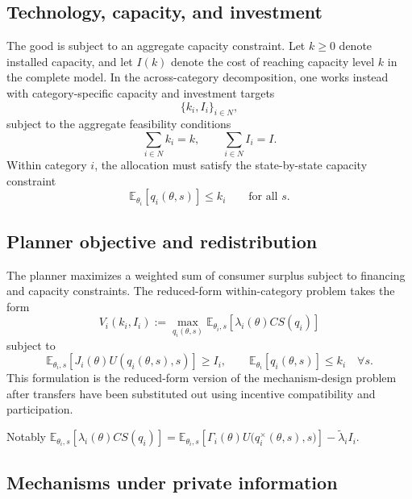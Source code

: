 \documentclass[master.tex]{subfiles}
\begin{document}
\subsection{Technology, capacity, and investment}

The good is subject to an aggregate capacity constraint. Let $k \ge 0$ denote installed capacity, and let $I(k)$ denote the cost of reaching capacity level $k$ in the complete model. In the across-category decomposition, one works instead with category-specific capacity and investment targets
\[
\{k_i,I_i\}_{i\in N},
\]
subject to the aggregate feasibility conditions
\[
\sum_{i\in N} k_i = k, \qquad \sum_{i\in N} I_i = I.
\]
Within category $i$, the allocation must satisfy the state-by-state capacity constraint
\[
\mathbb E_{\theta_i}[q_i(\theta,s)] \le k_i \qquad \text{for all } s.
\]

\subsection{Planner objective and redistribution}

The planner maximizes a weighted sum of consumer surplus subject to financing and capacity constraints. The reduced-form within-category problem takes the form
\[
V_i(k_i,I_i) := \max_{q_i(\theta,s)} \mathbb E_{\theta_i,s}[\lambda_i(\theta)CS(q_i)]
\]
subject to
\[
\mathbb E_{\theta_i,s}\!\left[J_i(\theta)U(q_i(\theta,s),s)\right] \ge I_i, \qquad \mathbb E_{\theta_i}[q_i(\theta,s)] \le k_i \quad \forall s.
\]
This formulation is the reduced-form version of the mechanism-design problem after transfers have been substituted out using incentive compatibility and participation.

Notably $\mathbb E_{\theta_i,s}[\lambda_i(\theta)CS(q_i)]=  \mathbb E_{\theta_i,s}\!\left[\Gamma_i(\theta) U\bigl(q_i^{\times}(\theta,s),s\bigr)\right] - \tilde \lambda_i I_i$.


\subsection{Mechanisms under private information}
\end{document}
